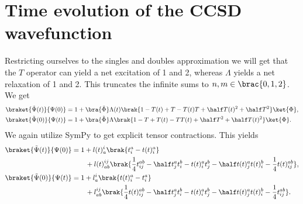     \section{Time evolution of the CCSD wavefunction}
        Restricting ourselves to the singles and doubles approximation we will
        get that the $T$ operator can yield a net excitation of 1 and 2, whereas
        $\Lambda$ yields a net relaxation of 1 and 2. This truncates the
        infinite sums to $n, m \in \brac{0, 1, 2}$. We get
        \begin{align}
            \braket{\tilde{\Psi}(t)}{\Psi(0)}
            &= 1
            + \bra{\tilde{\Phi}}\Lambda(t)\brak{
                1 - T(t) + T - T(t)T
                + \half T(t)^2 + \half T^2
            }\ket{\Phi},
            \\
            \braket{\tilde{\Psi}(0)}{\Psi(t)}
            &= 1
            + \bra{\tilde{\Phi}}\Lambda\brak{
                1 - T + T(t) - TT(t)
                + \half T^2 + \half T(t)^2
            }\ket{\Phi}.
        \end{align}
        We again utilize SymPy\cite{sympy} to get explicit tensor contractions.
        This yields
        \begin{align}
            \braket{\tilde{\Psi}(t)}{\Psi(0)}
            &=
            1
            + l(t)^{i}_{a} \brak{
                t^{a}_{i} - t(t)^{a}_{i}
            }
            \nonumber \\
            &\qquad
            + l(t)^{ij}_{ab} \brak{
                \frac{1}{4}t^{ab}_{ij}
                - \half t^{a}_{j} t^{b}_{i}
                - t(t)^{a}_{i} t^{b}_{j}
                - \half t(t)^{a}_{j} t(t)^{b}_{i}
                - \frac{1}{4} t(t)^{ab}_{ij}
            },
            \\
            \braket{\tilde{\Psi}(0)}{\Psi(t)}
            &=
            1
            + l^{i}_{a} \brak{
                t(t)^{a}_{i}
                - t^{a}_{i}
            }
            \nonumber \\
            &\qquad
            + l^{ij}_{ab} \brak{
                \frac{1}{4}t(t)^{ab}_{ij}
                - \half t^{a}_{j} t^{b}_{i}
                - t(t)^{a}_{i}t^{b}_{j}
                - \half t(t)^{a}_{j} t(t)^{b}_{i}
                - \frac{1}{4} t^{ab}_{ij}
            }.
        \end{align}
